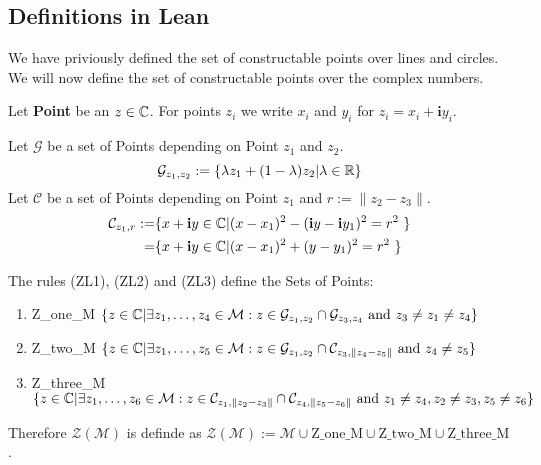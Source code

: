 \documentclass{../Proof_layout_PDF/TemplateExercise}
\begin{document}
\subsection{Definitions in Lean}
We have priviously defined the set of constructable points over lines and circles. We will now define the set of constructable points over the complex numbers.
\begin{definition}
    Let \textbf{Point} be an $z\in\mathbb{C}$. For points $z_i$ we write $x_i$ and $y_i$ for $z_i = x_i +\mathbf{i}y_i$.
\end{definition}
\begin{definition}
    Let \textbf{$\mathcal{G}$} be a set of Points depending on Point $z_1$ and $z_2$.
    \begin{equation*}
        \mathcal{G}_{z_1 ,z_2} := \{\lambda z_1 + (1 - \lambda) z_2 | \lambda \in \mathbb{R}  \}
    \end{equation*}
    Let \textbf{$\mathcal{C}$} be a set of Points depending on Point $z_1$ and $r:=\|z_2-z_3\|$.
    \begin{equation*}
        \begin{aligned}
            \mathcal{C}_{z_1,r} :=& \{ x +\textbf{i} y\in \mathbb{C} | (x - x_1)^2 - (\textbf{i} y-\textbf{i} y_1)^2 =r^2  \ \}\\
            =& \{ x +\textbf{i} y\in \mathbb{C} | (x - x_1)^2 + (y-y_1)^2 =r^2  \ \}
        \end{aligned}
        \end{equation*}
\end{definition}

\begin{definition}
The rules (ZL1), (ZL2) and (ZL3) define the Sets of Points:
\begin{enumerate}
    \item Z\_one\_M $\{z\in \mathbb{C} | \exists z_1,\dots,z_4\in\mathcal{M}: z \in \mathcal{G}_{z_1,z_2} \cap \mathcal{G}_{z_3,z_4} \text{ and } z_3 \ne z_1 \ne z_4\}$
    \item Z\_two\_M $\{z\in \mathbb{C} | \exists z_1,\dots,z_5\in\mathcal{M}: z \in \mathcal{G}_{z_1,z_2} \cap \mathcal{C}_{z_3,\|z_4-z_5\|} \text{ and } z_4\ne z_5\}$
    \item Z\_three\_M $\{z\in \mathbb{C} | \exists z_1,\dots,z_6\in\mathcal{M}: z \in \mathcal{C}_{z_1,\|z_2-z_3\|}  \cap \mathcal{C}_{z_4,\|z_5-z_6\|} \text{ and } z_1\ne z_4, z_2\ne z_3,z_5\ne z_6\}$
\end{enumerate}
Therefore $\mathcal{Z(M)}$ is definde as $ \mathcal{Z(M)}:= \mathcal{M} \cup \text{Z\_one\_M}\cup\text{Z\_two\_M}\cup\text{Z\_three\_M}$.
\end{definition}
\end{document}
